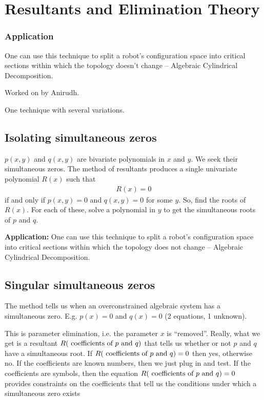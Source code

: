 \chapter{Resultants and Elimination Theory}

\subsection*{Application}
One can use this technique to split a robot's configuration space into critical sections within which the topology doesn't change -- Algebraic Cylindrical Decomposition.

Worked on by Anirudh.

One technique with several variations.

\section{Isolating simultaneous zeros}

$p(x, y)$ and $q(x, y)$ are bivariate polynomials in $x$ and $y$. We
seek their simultaneous zeros. The method of resultants produces a
single univariate polynomial $R(x)$ such that
\begin{align*}
  R(x) = 0
\end{align*}
if and only if $p(x, y) = 0$ and $q(x, y) = 0$ for some $y$. So, find
the roots of $R(x)$. For each of these, solve a polynomial in $y$ to
get the simultaneous roots of $p$ and $q$.

\textbf{Application:} One can use this technique to split a robot's
configuration space into critical sections within which the topology
does not change -- Algebraic Cylindrical Decomposition.

\section{Singular simultaneous zeros}

The method tells us when an overconstrained algebraic system has a
simultaneous zero. E.g. $p(x) = 0$ and $q(x) = 0$ (2 equations, 1
unknown).


This is parameter elimination, i.e. the parameter $x$ is
``removed''. Really, what we get is a resultant $R(~\text{coefficients of}
~p~\text{and}~q)$ that tells us whether or not $p$ and $q$ have a
simultaneous root. If $R(~\text{coefficients of}~p~\text{and}~q)= 0$ then yes,
otherwise no. If the coefficients are known numbers, then we just plug
in and test. If the coefficients are symbols, then the equation
$R(~\text{coefficients of}~p~\text{and}~q) = 0$ provides constraints on the coefficients that
tell us the conditions under which a simultaneous zero exists

